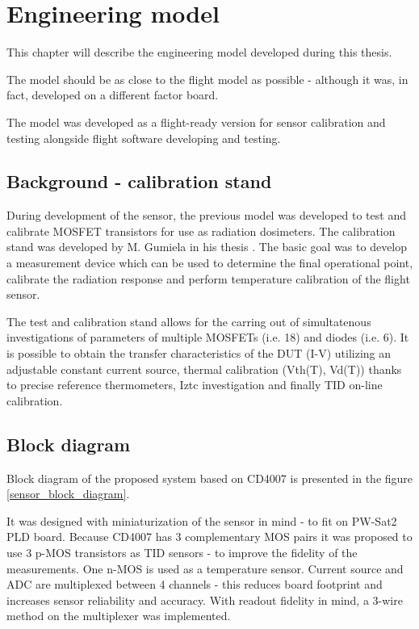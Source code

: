 \chapter{Engineering model}
\label{Engineering_model_chapter}
This chapter will describe the engineering model developed during this thesis.

The model should be as close to the flight model as possible - although it was, in fact, developed on a different factor board.

The model was developed as a flight-ready version for sensor calibration and testing alongside flight software developing and testing.

\section{Background - calibration stand}
    During development of the sensor, the previous model was developed to test and calibrate MOSFET transistors for use as radiation dosimeters. The calibration stand was developed by M. Gumiela in his thesis \cite{MGThesis}. The basic goal was to develop a measurement device which can be used to determine the final operational point, calibrate the radiation response and perform temperature calibration of the flight sensor.

    The test and calibration stand allows for the carring out of simultatenous investigations of parameters of multiple MOSFETs (i.e. 18) and diodes (i.e. 6). It is possible to obtain the transfer characteristics of the DUT (I-V) utilizing an adjustable constant current source, thermal calibration (Vth(T), Vd(T)) thanks to precise reference thermometers, Iztc investigation and finally TID on-line calibration.


\section{Block diagram}
    Block diagram of the proposed system based on CD4007 is presented in the figure \ref{sensor_block_diagram}.

    It was designed with miniaturization of the sensor in mind - to fit on PW-Sat2 PLD board. Because CD4007 has 3 complementary MOS pairs it was proposed to use 3 p-MOS transistors as TID sensors - to improve the fidelity of the measurements. One n-MOS is used as a temperature sensor. Current source and ADC are multiplexed between 4 channels - this reduces board footprint and increases sensor reliability and accuracy. With readout fidelity in mind, a 3-wire method on the multiplexer was implemented.

